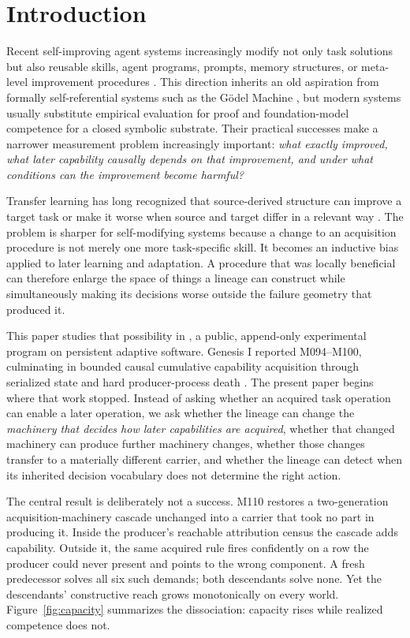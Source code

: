 \section{Introduction}
Recent self-improving agent systems increasingly modify not only task solutions but also reusable skills, agent programs, prompts, memory structures, or meta-level improvement procedures \cite{yin2024godelagent,robeyns2025selfimproving,zhang2025dgm,zhang2026hyperagents,wang2026metaskill,ren2026survey}. This direction inherits an old aspiration from formally self-referential systems such as the G{\"o}del Machine \cite{schmidhuber2007godel}, but modern systems usually substitute empirical evaluation for proof and foundation-model competence for a closed symbolic substrate. Their practical successes make a narrower measurement problem increasingly important: \emph{what exactly improved, what later capability causally depends on that improvement, and under what conditions can the improvement become harmful?}

Transfer learning has long recognized that source-derived structure can improve a target task or make it worse when source and target differ in a relevant way \cite{rosenstein2005transfer,pan2010transfer,wang2019negative,zhang2020negative}. The problem is sharper for self-modifying systems because a change to an acquisition procedure is not merely one more task-specific skill. It becomes an inductive bias applied to later learning and adaptation. A procedure that was locally beneficial can therefore enlarge the space of things a lineage can construct while simultaneously making its decisions worse outside the failure geometry that produced it.

This paper studies that possibility in \genesis, a public, append-only experimental program on persistent adaptive software. Genesis I reported M094--M100, culminating in bounded causal cumulative capability acquisition through serialized state and hard producer-process death \cite{mets2026genesis1}. The present paper begins where that work stopped. Instead of asking whether an acquired task operation can enable a later operation, we ask whether the lineage can change the \emph{machinery that decides how later capabilities are acquired}, whether that changed machinery can produce further machinery changes, whether those changes transfer to a materially different carrier, and whether the lineage can detect when its inherited decision vocabulary does not determine the right action.

The central result is deliberately not a success. M110 restores a two-generation acquisition-machinery cascade unchanged into a carrier that took no part in producing it. Inside the producer's reachable attribution census the cascade adds capability. Outside it, the same acquired rule fires confidently on a row the producer could never present and points to the wrong component. A fresh predecessor solves all six such demands; both descendants solve none. Yet the descendants' constructive reach grows monotonically on every world. Figure~\ref{fig:capacity} summarizes the dissociation: capacity rises while realized competence does not.

